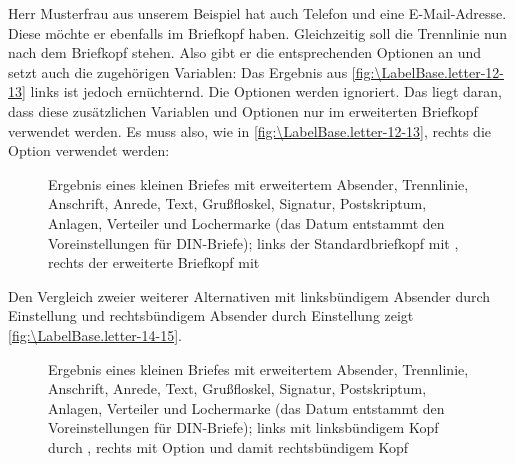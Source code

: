 \begin{Example}
  Herr Musterfrau aus unserem Beispiel hat auch Telefon und eine
  E-Mail-Adresse. Diese möchte er ebenfalls im Briefkopf haben. Gleichzeitig
  soll die Trennlinie nun nach dem Briefkopf stehen. Also gibt er die
  entsprechenden Optionen an und setzt auch die zugehörigen Variablen:%
  Das Ergebnis aus \autoref{fig:\LabelBase.letter-12-13} links ist jedoch
  ernüchternd. Die Optionen werden ignoriert. Das liegt daran, dass diese
  zusätzlichen Variablen und Optionen nur im erweiterten Briefkopf verwendet
  werden. Es muss also, wie in \autoref{fig:\LabelBase.letter-12-13}, rechts die
  Option  verwendet werden:
  \begin{figure}
    \centering
    \quad
    \caption[{Beispiel: Brief mit erweitertem Absender, Trennlinie, Anschrift,
      Anrede, Text, Grußfloskel, Signatur, Postskriptum, Anlagen, Verteiler
      und Lochermarke; Standard- vs. erweiterter Briefkopf}]{Ergebnis eines
      kleinen Briefes mit erweitertem Absender, Trennlinie, Anschrift, Anrede,
      Text, Grußfloskel, Signatur, Postskriptum, Anlagen, Verteiler und
      Lochermarke (das Datum entstammt den Voreinstellungen für DIN-Briefe);
      links der Standardbriefkopf mit
      , rechts der erweiterte
      Briefkopf mit }
    \label{fig:\LabelBase.letter-12-13}
  \end{figure}

  Den Vergleich zweier weiterer Alternativen mit linksbündigem Absender durch
  Einstellung  und rechtsbündigem
  Absender durch Einstellung  zeigt
  \autoref{fig:\LabelBase.letter-14-15}.
  \begin{figure}
    \centering
    \quad
    \caption[{Beispiel: Brief mit erweitertem Absender, Trennlinie, Anschrift,
      Anrede, Text, Grußfloskel, Signatur, Postskriptum, Anlagen, Verteiler
      und Lochermarke; links- vs. rechtsbündiger Briefkopf}]{Ergebnis eines
      kleinen Briefes mit erweitertem Absender, Trennlinie, Anschrift, Anrede,
      Text, Grußfloskel, Signatur, Postskriptum, Anlagen, Verteiler und
      Lochermarke (das Datum entstammt den Voreinstellungen für DIN-Briefe);
      links mit linksbündigem Kopf durch
      , rechts mit Option
       und damit rechtsbündigem
      Kopf}
    \label{fig:\LabelBase.letter-14-15}
  \end{figure}
\end{Example}
%
\EndIndexGroup


